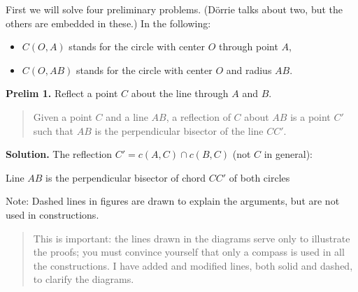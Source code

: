 \documentclass[11pt,a4paper]{article}
\newcommand*{\qed}{%
$\quad\quad$\raisebox{2pt}{\framebox[10pt]{\rule{0pt}{4pt}}}%
}
\begin{document}
First we will solve four preliminary problems. (Dörrie talks about two, but the others are embedded in these.) In the following:
\begin{itemize}
\item $C(O,A)$ stands for the circle with center $O$ through point $A$,
\item $C(O,AB)$ stands for the circle with center $O$ and radius $AB$.
\end{itemize}


\textbf{Prelim 1.} Reflect a point $C$ about the line through $A$ and $B$.

\begin{quote}
Given a point $C$ and a line $AB$, a reflection of $C$ about $AB$ is a point $C'$ such that $AB$ is the perpendicular bisector of the line $CC'$.
\end{quote}

\textbf{Solution.} The reflection $C'=c(A,C) \cap c(B,C)$ (not $C$ in general):

\begin{center}

{\centering Line $AB$ is the perpendicular bisector of chord $CC'$ of both circles}
\end{center}

Note: Dashed lines in figures are drawn to explain the arguments, but are not used in constructions.  \qed
\begin{quote}
This is important: the lines drawn in the diagrams serve only to illustrate the proofs; you must convince yourself that only a compass is used in all the constructions. I have added and modified lines, both solid and dashed, to clarify the diagrams.
\end{quote}

\end{document}
